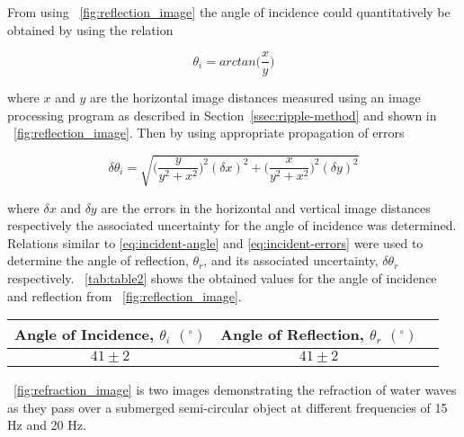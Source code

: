 \documentclass{article}
\newcommand{\figref}[2][\figurename~]{#1\ref{#2}}
\newcommand{\tabref}[2][\tablename~]{#1\ref{#2}}
\newcommand{\secref}[2][Section~]{#1\ref{#2}}
\begin{document}
\vspace{2mm}
\noindent
From using \figref{fig:reflection_image} the angle of incidence could quantitatively be obtained by using the relation

\begin{equation}
\label{eq:incident-angle}
\theta_i = arctan\bigg(\frac{x}{y}\bigg)
\end{equation}

\vspace{2mm}
\noindent
where $x$ and $y$ are the horizontal image distances measured using an image processing program as described in \secref{ssec:ripple-method} and shown in \figref{fig:reflection_image}. Then by using appropriate propagation of errors

\begin{equation}
\label{eq:incident-errors}
\delta \theta_i = \sqrt{\bigg(\frac{y}{y^2 + x^2}\bigg)^2(\delta x)^2 + \bigg(\frac{x}{y^2 + x^2}\bigg)^2(\delta y)^2}
\end{equation}

\vspace{2mm}
\noindent
where $\delta x$ and $\delta y$ are the errors in the horizontal and vertical image distances respectively the associated uncertainty for the angle of incidence was determined. Relations similar to \eqref{eq:incident-angle} and \eqref{eq:incident-errors} were used to determine the angle of reflection, $\theta_r$, and its associated uncertainty, $\delta \theta_r$ respectively. \tabref{tab:table2} shows the obtained values for the angle of incidence and reflection from \figref{fig:reflection_image}.

\vspace{5mm}
\begin{table*}[h]
\centering %
\caption{Table of values for the angle of incidence and reflection for water waves at 20 Hz shown in \figref{fig:reflection_image}.}
\label{tab:table2}
\begin{tabular}{|c|c|c|}
\hline
Angle of Incidence, $\theta_i$ $(^{\circ})$ & Angle of Reflection, $\theta_r$ $(^{\circ})$ \\
\hline
$41 \pm 2$ & $41 \pm 2$ \\
\hline
\end{tabular}
\end{table*}


\newpage
\vspace{2mm}
\noindent
\figref{fig:refraction_image} is two images demonstrating the refraction of water waves as they pass over a submerged semi-circular object at different frequencies of 15 Hz and 20 Hz.
\end{document}
